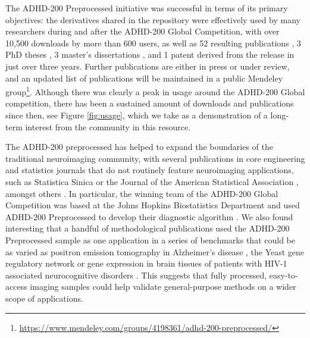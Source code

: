 \documentclass[preprint,12pt,3p]{elsarticle}
\begin{document}
The ADHD-200 Preprocessed initiative was successful in terms of its primary objectives: the derivatives shared in the repository were effectively used by many researchers during and after the ADHD-200 Global Competition, with over 10,500 downloads by more than 600 users, as well as 52 resulting publications \cite{Rangarajan2014, Liang2012, Tabas2014, Rangarajan2015, Mahanand2013, Lifshitz2012, Fujita2013, Ji2011, Li2015, Li2013, Liu2012, DosSantosSiqueira2014, Olivetti2014, Han2015, Wang2013a, Dey2014, Bellec2012, Bohland2012, Chang2012, Cheng2012, Colby2012, Dai2012, Dey2012, Eloyan2012, Olivetti2012, Sato2012a, Subramanian2013, Carmona2015, Hou2015, Deshpande2015, She2014, Lavoie-Courchesne2012b, Chen2015, Nunez-Garcia2015, Solmaz2012, Anderson2014, KadkhodaeianBakhtiari2012, Sato2013, Kyeong2015, Sato2012, Takahashi2012, He2013, Kong2013, Yao2013, Yang2015, Ahn2015, Fujita2014, Reiss2014,nachamai2016sub,Brown20161238,Yu2016,Fujita2015}, 3 PhD theses \cite{Colby2012a, Dey2014phd, Zhang2012}, 3 master's dissertations \cite{VanGalenLast2011, Vidal2014, Wang2013}, and 1 patent \cite{Dey2013} derived from the release in just over three years. Further publications are either in press or under review, and an updated list of publications will be maintained in a public Mendeley group\footnote{\url{https://www.mendeley.com/groups/4198361/adhd-200-preprocessed/}}. Although there was clearly a peak in usage around the ADHD-200 Global competition, there has been a sustained amount of downloads and publications since then, see Figure \ref{fig:usage}, which we take as a demonstration of a long-term interest from the community in this resource. 
\par
The ADHD-200 preprocessed has helped to expand the boundaries of the traditional neuroimaging community, with several publications in core engineering and statistics journals that do not routinely feature neuroimaging applications, such as Statistica Sinica \citep{Yang2015} or the Journal of the American Statistical Association \citep{Chen2015}, amongst others \citep[e.g.][]{Liang2012, Rangarajan2015, Rangarajan2014, Mahanand2013, Ji2011, Li2015, Li2013, Liu2012, Subramanian2013, Hou2015, Deshpande2015, She2014, He2013, Kong2013, Ahn2015}. In particular, the winning team of the ADHD-200 Global Competition was based at the Johns Hopkins Biostatistics Department and used ADHD-200 Preprocessed to develop their diagnostic algorithm \cite{Eloyan2012}. We also found interesting that a handful of methodological publications used the ADHD-200 Preprocessed sample as one application in a series of benchmarks that could be as varied as positron emission tomography in Alzheimer's disease \citep{Yang2015}, the Yeast gene regulatory network \citep{She2014} or gene expression in brain tissues of patients with HIV-1 associated neurocognitive disorders \citep{Liu2012}. This suggests that fully processed, easy-to-access imaging samples could help validate general-purpose methods on a wider scope of applications.
\end{document}
